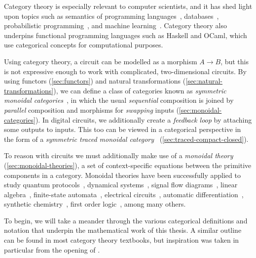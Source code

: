 Category theory is especially relevant to computer scientists, and it has shed
light upon topics such as semantics of programming
languages~\cite{oles1982categorytheoretic}, databases~\cite{spivak2012functorial},
probabilistic programming~\cite{cho2019disintegration,fritz2020synthetic}, and
machine learning~\cite{fong2019backprop,cockett2020reverse}.
Category theory also underpins functional programming languages such as
Haskell and OCaml, which use categorical concepts for computational purposes.

Using category theory, a circuit can be modelled as a morphism \(A \to B\), but
this is not expressive enough to work with complicated, two-dimensional
circuits.
By using functors (\cref{sec:functors}) and natural transformations
(\cref{sec:natural-transformations}), we can define a class of categories known
as \emph{symmetric monoidal categories}~\cite{maclane1963natural}, in which the
usual \emph{sequential} composition is joined by \emph{parallel} composition
and morphisms for \emph{swapping} inputs (\cref{sec:monoidal-categories}).
In digital circuits, we additionally create a
\emph{feedback loop} by attaching some outputs to inputs.
This too can be viewed in a categorical perspective in the form of a
\emph{symmetric traced monoidal category}~\cite{joyal1996traced}
(\cref{sec:traced-compact-closed}).

To reason with circuits we must additionally make use of a
\emph{monoidal theory}
(\cref{sec:monoidal-theories}), a set of context-specific equations between
the primitive components in a category.
Monoidal theories have been successfully applied to study quantum
protocols~\cite{coecke2008interacting}, dynamical
systems~\cite{baez2015categories,fong2016categorical}, signal flow
diagrams~\cite{bonchi2014categorical,bonchi2015full,bonchi2017refinement,bonchi2021survey},
linear algebra~\cite{bonchi2017interacting,zanasi2015interacting,bonchi2019graphical,boisseau2022graphical},
finite-state automata~\cite{piedeleu2021string,piedeleu2022finite}, electrical
circuits~\cite{boisseau2022string}, automatic
differentiation~\cite{alvarez-picallo2023functorial}, synthetic
chemistry~\cite{gale2023categorical}, first order
logic~\cite{bonchi2024diagrammatic}, among many others.

To begin, we will take a meander through the various categorical definitions and
notation that underpin the mathematical work of this thesis.
A similar outline can be found in most category theory textbooks, but
inspiration was taken in particular from the opening of
\cite{ghica2023string}.








